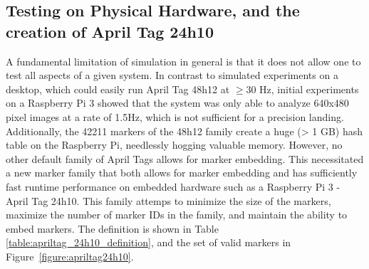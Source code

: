 \subsection{Testing on Physical Hardware, and the creation of April Tag 24h10}

A fundamental limitation of simulation in general is that it does not allow one to test all aspects of a given system.
In contrast to simulated experiments on a desktop, which could easily run April Tag 48h12 at $\geq30$ Hz,
initial experiments on a Raspberry Pi 3 showed that
the system was only able to analyze 640x480 pixel images at a rate of 1.5Hz,
which is not sufficient for a precision landing.
Additionally, the 42211 markers of the 48h12 family create a huge (> 1 GB) hash table
on the Raspberry Pi, needlessly hogging valuable memory.
However, no other default family of April Tags allows for marker embedding.
This necessitated a new marker family that both allows for marker embedding and has sufficiently fast runtime performance
on embedded hardware such as a Raspberry Pi 3 - April Tag 24h10.
This family attemps to minimize the size of the markers,
maximize the number of marker IDs in the family,
and maintain the ability to embed markers.
The definition is shown in Table \ref{table:apriltag_24h10_definition}, and the set of valid markers in Figure~\ref{figure:apriltag24h10}.

